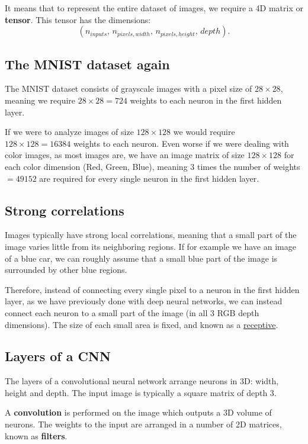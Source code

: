 \documentclass[%
oneside,                 %
final,                   %
10pt]{article}
\begin{document}
It means that to represent the entire
dataset of images, we require a 4D matrix or \textbf{tensor}. This tensor has the dimensions:  
\[  
(n_{inputs},\, n_{pixels, width},\, n_{pixels, height},\, depth) .
\]

\subsection{The MNIST dataset again}

The MNIST dataset consists of grayscale images with a pixel size of
$28\times 28$, meaning we require $28 \times 28 = 724$ weights to each
neuron in the first hidden layer.

If we were to analyze images of size $128\times 128$ we would require
$128 \times 128 = 16384$ weights to each neuron. Even worse if we were
dealing with color images, as most images are, we have an image matrix
of size $128\times 128$ for each color dimension (Red, Green, Blue),
meaning 3 times the number of weights $= 49152$ are required for every
single neuron in the first hidden layer.


\subsection{Strong correlations}

Images typically have strong local correlations, meaning that a small
part of the image varies little from its neighboring regions. If for
example we have an image of a blue car, we can roughly assume that a
small blue part of the image is surrounded by other blue regions.

Therefore, instead of connecting every single pixel to a neuron in the
first hidden layer, as we have previously done with deep neural
networks, we can instead connect each neuron to a small part of the
image (in all 3 RGB depth dimensions).  The size of each small area is
fixed, and known as a \href{{https://en.wikipedia.org/wiki/Receptive_field}}{receptive}.


\subsection{Layers of a CNN}
The layers of a convolutional neural network arrange neurons in 3D: width, height and depth.  
The input image is typically a square matrix of depth 3. 

A \textbf{convolution} is performed on the image which outputs
a 3D volume of neurons. The weights to the input are arranged in a number of 2D matrices, known as \textbf{filters}.
\end{document}
